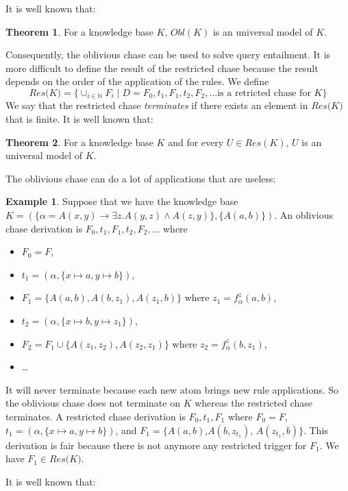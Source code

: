 \documentclass{article}
\theoremstyle{definition}
\newtheorem{theorem}{Theorem}[section]
\newtheorem{example}{Example}[section]
\theoremstyle{remark}
\def \N {\mathbb N}
\begin{document}
It is well known that:

\begin{theorem}
For a knowledge base $K$, $\textit{Obl}(K)$ is an universal model of $K$.
\end{theorem}

Consequently, the oblivious chase can be used to solve query entailment. It is more difficult to define the result of the restricted chase because the result depends on the order of the application of the rules. We define $$\textit{Res(K)}=\{\cup_{i \in \N}F_i \mid D = F_0,t_1,F_1,t_2,F_2,\ldots \text{is a retricted chase for } K\}$$ We say that the restricted chase \emph{terminates} if there exists an element in $\textit{Res(K)}$ that is finite. It is well known that:

\begin{theorem}
For a knowledge base $K$ and for every $U \in \textit{Res}(K)$, $U$ is an universal model of $K$.
\end{theorem}


The oblivious chase  can do a lot of applications that are useless: 
\begin{example}
Suppose that we have the knowledge base $K=(\{\alpha  = A(x,y) \rightarrow \exists z.A(y,z) \wedge A(z,y)\},\{A(a,b)\})$. An oblivious chase derivation is $F_0,t_1,F_1,t_2,F_2,...$ where
\begin{itemize}
\item $F_0 = F$, 
\item $t_1=(\alpha,\{x \mapsto a, y \mapsto b\})$, 
\item $F_1=\{A(a,b),A(b,z_1),A(z_1,b)\}$ where $z_1 =f_\alpha^z(a,b)$,
\item $t_2=(\alpha,\{x \mapsto b, y \mapsto z_1\})$, 
\item $F_2=F_1 \cup \{ A(z_1,z_2), A(z_2,z_1)\}$ where $z_2= f_\alpha^z(b,z_1)$, 
\item \ldots\ 
\end{itemize} 
It will never terminate because each new atom brings new rule applications. So the oblivious chase does not terminate on $K$ whereas the restricted chase terminates. A restricted chase derivation is $F_0,t_1,F_1$ where $F_0 = F$, $t_1=(\alpha,\{x \mapsto a, y \mapsto b\})$, and $F_1=\{A(a,b)$,$A(b,z_{t_1})$, $A(z_{t_1},b)\}$. This derivation is fair because there is not anymore any restricted trigger for $F_1$. We have $F_1 \in \textit{Res(K)}$.
\end{example}


It is well known that:
\end{document}
